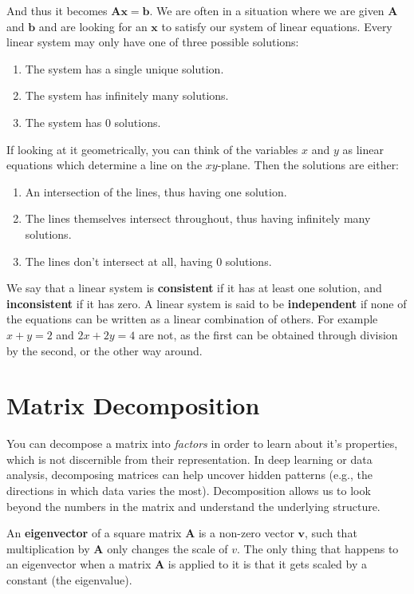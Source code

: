 And thus it becomes $\mathbf{Ax} = \mathbf{b}$. We are often in a situation where we are given $\mathbf{A}$ and $\mathbf{b}$ and are looking for an $\mathbf{x}$ to satisfy our system of linear equations. Every linear system may only have one of three possible solutions:
\begin{enumerate}
	\item The system has a single unique solution.
	\item The system has infinitely many solutions.
	\item The system has 0 solutions.
\end{enumerate}

If looking at it geometrically, you can think of the variables $x$ and $y$ as linear equations which determine a line on the $xy$-plane. Then the solutions are either:
\begin{enumerate}
	\item An intersection of the lines, thus having one solution.
	\item The lines themselves intersect throughout, thus having infinitely many solutions.
	\item The lines don't intersect at all, having 0 solutions.
\end{enumerate}

We say that a linear system is \textbf{consistent} if it has at least one solution, and \textbf{inconsistent} if it has zero. A linear system is said to be \textbf{independent} if none of the equations can be written as a linear combination of others. For example $x+y=2$ and $2x+2y=4$ are not, as the first can be obtained through division by the second, or the other way around.

\section{Matrix Decomposition}%
\label{sec:label}

You can decompose a matrix into \textit{factors} in order to learn about it's properties, which is not discernible from their representation.
In deep learning or data analysis, decomposing matrices can help uncover hidden patterns (e.g., the directions in which data varies the most). Decomposition allows us to look beyond the numbers in the matrix and understand the underlying structure.

An \textbf{eigenvector} of a square matrix \textbf{A} is a non-zero vector $\mathbf{v}$, such that multiplication by $\mathbf{A}$ only changes the scale of \textbf{$v$}. The only thing that happens to an eigenvector when a matrix $\mathbf{A}$ is applied to it is that it gets scaled by a constant (the eigenvalue).

